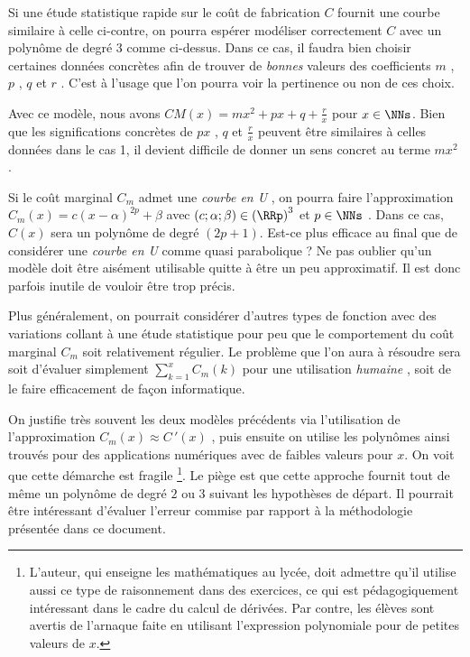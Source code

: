 Si une étude statistique rapide sur le coût de fabrication $C$ fournit une courbe similaire à celle ci-contre, on pourra espérer modéliser correctement $C$ avec un polynôme de degré 3 comme ci-dessus. Dans ce cas, il faudra bien choisir  certaines données concrètes afin de trouver de \emph{\og bonnes \fg} valeurs des coefficients $m$ , $p$ , $q$ et $r$ . C'est à l'usage que l'on pourra voir la pertinence ou non de ces choix.


\bigskip

Avec ce modèle, nous avons $CM(x) = m x^2 + p x + q + \frac{r}{x}$ pour $x \in \NNs$.
Bien que les significations concrètes de $p x$ , $q$  et $\frac{r}{x}$ peuvent être similaires à celles données dans le cas 1, il devient difficile de donner un sens concret au terme $m x^2$ .  




\begin{remark}
	Si le coût marginal $C_m$ admet une \emph{\og courbe en U \fg}, on pourra faire l'approximation $C_m(x) = c (x - \alpha)^{2p} + \beta$ avec $(c ; \alpha ; \beta) \in \left( \RRp \right)^3$ et $p \in \NNs$ .
	Dans ce cas, $C(x)$ sera un polynôme de degré $(2p + 1)$. Est-ce plus efficace au final que de considérer une \emph{\og courbe en U \fg} comme quasi parabolique ?
	Ne pas oublier qu'un modèle doit être aisément utilisable quitte à être un peu approximatif. Il est donc parfois inutile de vouloir être trop précis.
\end{remark}




\begin{remark}
	Plus généralement, on pourrait considérer d'autres types de fonction avec des variations collant à une étude statistique pour peu que le comportement du coût marginal $C_m$ soit relativement régulier. Le problème que l'on aura à résoudre sera soit d'évaluer simplement $\displaystyle \sum_{k = 1}^{x} C_m(k)$ pour une utilisation \emph{\og humaine \fg}, soit de le faire efficacement de façon informatique.
\end{remark}




\begin{remark}
	On justifie très souvent les deux modèles précédents via l'utilisation de l'approximation $C_m(x) \approx C\,'(x)$ , puis ensuite on utilise les polynômes ainsi trouvés pour des applications numériques avec de faibles valeurs pour $x$. On voit que cette démarche est fragile
	\footnote{
		L'auteur, qui enseigne les mathématiques au lycée, doit admettre qu'il utilise aussi ce type de raisonnement dans des exercices, ce qui est pédagogiquement intéressant dans le cadre du calcul de dérivées. Par contre, les élèves sont avertis de l'arnaque faite en utilisant l'expression polynomiale pour de petites valeurs de $x$.
	}.
	Le piège est que cette approche fournit tout de même un polynôme de degré $2$ ou $3$ suivant les hypothèses de départ.
	Il pourrait être intéressant d'évaluer l'erreur commise par rapport à la méthodologie présentée dans ce document.
\end{remark}
